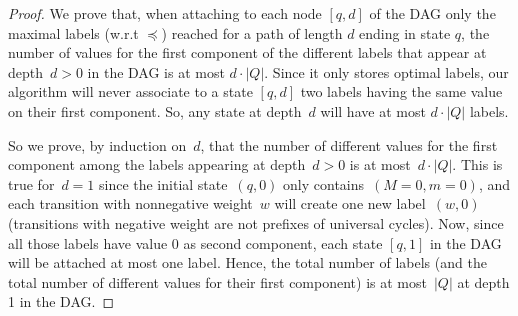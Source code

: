 \begin{proof}
We prove that, when attaching to each node $[q,d]$ of the DAG only the maximal labels (w.r.t $\preceq$) reached for a path of length $d$ ending in state $q$, the number of
values for the first component of the different labels that appear at
depth~$d>0$ in the DAG is at most $d\cdot |Q|$. Since it only
stores optimal labels, our algorithm will never associate to a state $[q,d]$
two labels having the same value on their first component. So, any
state at depth~$d$ will have at most $d\cdot |Q|$ labels.

So we prove, by induction on~$d$, that the number of different values
for the first component among the labels appearing at depth~$d>0$ is
at most~$d\cdot|Q|$. 
%
This is true for~$d=1$ since the initial state~$(q,0)$ only
contains~$(M=0,m=0)$, and each transition with nonnegative weight~$w$
will create one new label~$(w,0)$ (transitions with negative weight
are not prefixes of universal cycles). Now, since all those labels
have value 0 as second component, each state $[q,1]$ in the DAG will be attached at most one label. Hence, the total number of labels (and the total number of different values for their first
component) is at most~$|Q|$ at depth 1 in the DAG.


\end{proof}
